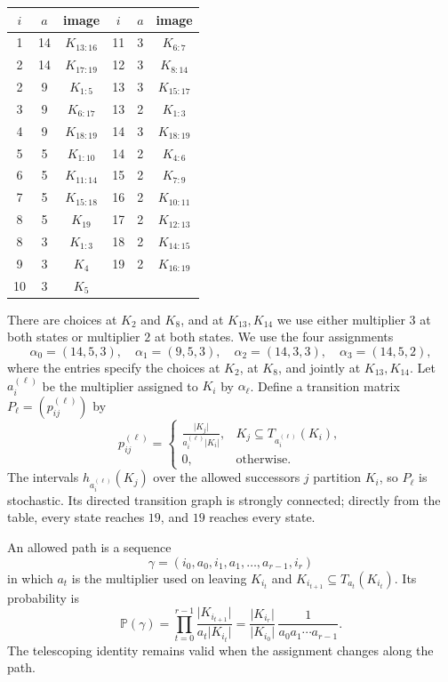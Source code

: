 \documentclass[11pt,a4paper]{amsart}
\newcommand{\Pp}{\mathbb P}
\newcommand{\abs}[1]{\lvert #1\rvert}
\begin{document}
\begin{center}
\small
\begin{tabular}{ccc@{\qquad}ccc}
\toprule
$i$ & $a$ & image & $i$ & $a$ & image\\
\midrule
1&14&$K_{13:16}$ &11&3&$K_{6:7}$\\
2&14&$K_{17:19}$ &12&3&$K_{8:14}$\\
2&9 &$K_{1:5}$   &13&3&$K_{15:17}$\\
3&9 &$K_{6:17}$  &13&2&$K_{1:3}$\\
4&9 &$K_{18:19}$ &14&3&$K_{18:19}$\\
5&5 &$K_{1:10}$  &14&2&$K_{4:6}$\\
6&5 &$K_{11:14}$ &15&2&$K_{7:9}$\\
7&5 &$K_{15:18}$ &16&2&$K_{10:11}$\\
8&5 &$K_{19}$    &17&2&$K_{12:13}$\\
8&3 &$K_{1:3}$   &18&2&$K_{14:15}$\\
9&3 &$K_4$       &19&2&$K_{16:19}$\\
10&3&$K_5$       &&&\\
\bottomrule
\end{tabular}
\end{center}

There are choices at $K_2$ and $K_8$, and at $K_{13},K_{14}$ we use either multiplier $3$ at both states or multiplier $2$ at both states. We use the four assignments
\[
 \alpha_0=(14,5,3),\quad \alpha_1=(9,5,3),\quad
 \alpha_2=(14,3,3),\quad \alpha_3=(14,5,2),
\]
where the entries specify the choices at $K_2$, at $K_8$, and jointly at $K_{13},K_{14}$. Let $a_i^{(\ell)}$ be the multiplier assigned to $K_i$ by $\alpha_\ell$. Define a transition matrix $P_\ell=(p_{ij}^{(\ell)})$ by
\[
 p_{ij}^{(\ell)}=
 \begin{cases}
 \displaystyle\frac{\abs{K_j}}{a_i^{(\ell)}\abs{K_i}},
 &K_j\subseteq T_{a_i^{(\ell)}}(K_i),\\[6pt]
 0,&\text{otherwise}.
 \end{cases}
\]
The intervals $h_{a_i^{(\ell)}}(K_j)$ over the allowed successors $j$ partition $K_i$, so $P_\ell$ is stochastic. Its directed transition graph is strongly connected; directly from the table, every state reaches $19$, and $19$ reaches every state.

An allowed path is a sequence
\[
 \gamma=(i_0,a_0,i_1,a_1,\ldots,a_{r-1},i_r)
\]
in which $a_t$ is the multiplier used on leaving $K_{i_t}$ and $K_{i_{t+1}}\subseteq T_{a_t}(K_{i_t})$. Its probability is
\begin{equation}\label{eq:path-probability}
 \Pp(\gamma)=\prod_{t=0}^{r-1}
 \frac{\abs{K_{i_{t+1}}}}{a_t\abs{K_{i_t}}}
 =\frac{\abs{K_{i_r}}}{\abs{K_{i_0}}}\,
  \frac1{a_0a_1\cdots a_{r-1}}.
\end{equation}
The telescoping identity remains valid when the assignment changes along the path.
\end{document}
